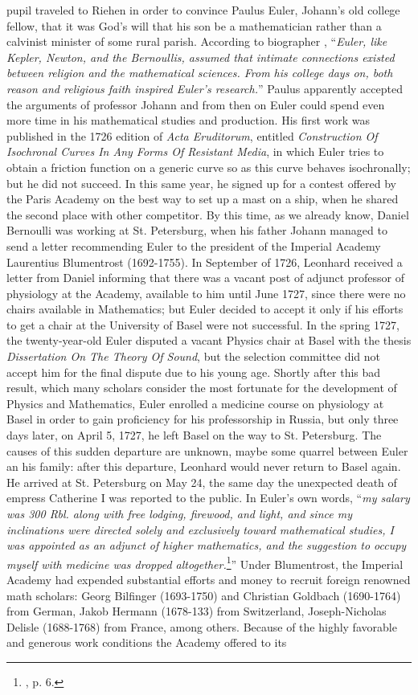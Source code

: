 pupil traveled to Riehen in order to convince Paulus Euler, Johann's old college fellow, that it was God's will that his son be a mathematician rather than a calvinist minister of some rural parish. According to biographer \cite{calinger_2016_1}, ``\emph{Euler, like Kepler, Newton, and the Bernoullis, assumed that intimate connections existed between religion and the mathematical sciences. From his college days on, both reason and religious faith inspired Euler's research.}'' Paulus apparently accepted the arguments of professor Johann and from then on Euler could spend even more time in his mathematical studies and production. His first work was published in the 1726 edition of \emph{Acta Eruditorum}, entitled \emph{Construction Of Isochronal Curves In Any Forms Of Resistant Media}, in which Euler tries to obtain a friction function on a generic curve so as this curve behaves isochronally; but he did not succeed. In this same year, he signed up for a contest offered by the Paris Academy on the best way to set up a mast on a ship, when he shared the second place with other competitor. By this time, as we already know, Daniel Bernoulli was working at St. Petersburg, when his father Johann managed to send a letter recommending Euler to the president of the Imperial Academy Laurentius Blumentrost (1692-1755). In September of 1726, Leonhard received a letter from Daniel informing that there was a vacant post of adjunct professor of physiology at the Academy, available to him until June 1727, since there were no chairs available in Mathematics; but Euler decided to accept it only if his efforts to get a chair at the University of Basel were not successful. In the spring 1727, the twenty-year-old Euler disputed a vacant Physics chair at Basel with the thesis \emph{Dissertation On The Theory Of Sound}, but the selection committee did not accept him for the final dispute due to his young age. Shortly after this bad result, which many scholars consider the most fortunate for the development of Physics and Mathematics, Euler enrolled a medicine course on physiology at Basel in order to gain proficiency for his professorship in Russia, but only three days later, on April 5, 1727, he left Basel on the way to St. Petersburg. The causes of this sudden departure are unknown, maybe some quarrel between Euler an his family: after this departure, Leonhard would never return to Basel again. He arrived at St. Petersburg on May 24, the same day the unexpected death of empress Catherine I was reported to the public. In Euler's own words, ``\emph{my salary was 300 Rbl. along with free lodging, firewood, and light, and since my inclinations were directed solely and exclusively toward mathematical studies, I was appointed as an adjunct of higher mathematics, and the suggestion to occupy myself with medicine was dropped altogether.}\footnote{\cite{fellmann_2007_1}, p. 6.}'' Under Blumentrost, the Imperial Academy had expended substantial efforts and money to recruit foreign renowned math scholars: Georg Bilfinger (1693-1750) and Christian Goldbach (1690-1764) from German, Jakob Hermann (1678-133) from Switzerland, Joseph-Nicholas Delisle (1688-1768) from France, among others. Because of the highly favorable and generous work conditions the Academy offered to its 